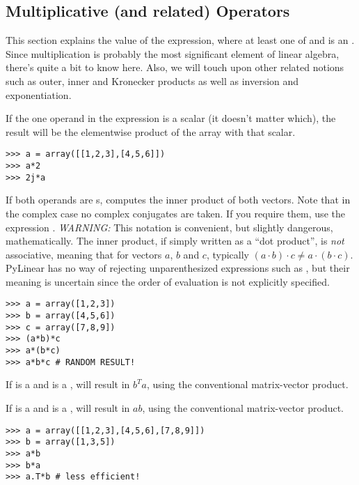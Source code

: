 \subsection{Multiplicative (and related) Operators}
\label{subsec:arraymultiplication}
This section explains the value of the expression, where at
least one of  and  is an . Since multiplication
is probably the most significant element of linear algebra, there's quite
a bit to know here. Also, we will touch upon other related notions such as outer,
inner and Kronecker products as well as inversion and exponentiation.

If the one operand in the expression  is a scalar (it doesn't matter
which), the result will be the elementwise product of the array with that
scalar.

\begin{verbatim}
>>> a = array([[1,2,3],[4,5,6]])
>>> a*2
>>> 2j*a
\end{verbatim}

If both operands are s,  computes the inner
product of both vectors. Note that in the complex case no complex
conjugates are taken. If you require them, use the expression
. \emph{WARNING:} This notation is convenient, but
slightly dangerous, mathematically. The inner product, if simply
written as a ``dot product'', is \emph{not} associative, meaning that
for vectors $a$, $b$ and $c$, typically $(a\cdot b)\cdot
c\not=a\cdot(b\cdot c)$.  PyLinear has no way of rejecting
unparenthesized expressions such as , but their meaning is
uncertain since the order of evaluation is not explicitly specified.

\begin{verbatim}
>>> a = array([1,2,3])
>>> b = array([4,5,6])
>>> c = array([7,8,9])
>>> (a*b)*c
>>> a*(b*c)
>>> a*b*c # RANDOM RESULT!
\end{verbatim}

If  is a  and  is a ,
 will result in $b^Ta$, using the conventional matrix-vector
product.

If  is a  and  is a ,
 will result in $a b$, using the conventional matrix-vector
product.

\begin{verbatim}
>>> a = array([[1,2,3],[4,5,6],[7,8,9]])
>>> b = array([1,3,5])
>>> a*b
>>> b*a
>>> a.T*b # less efficient!
\end{verbatim}

